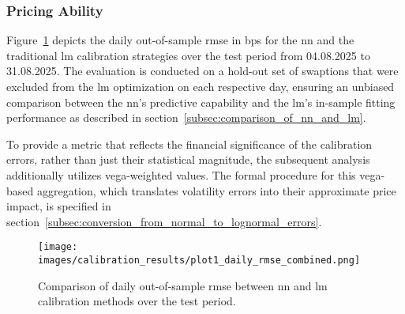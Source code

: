 \subsubsection{Pricing Ability}
Figure~\ref{fig:daily_rmse_comparison} depicts the daily out-of-sample \ac{rmse} in \ac{bps} for the \ac{nn} and the traditional \ac{lm} calibration strategies over the test period from 04.08.2025 to 31.08.2025. The evaluation is conducted on a hold-out set of swaptions that were excluded from the \ac{lm} optimization on each respective day, ensuring an unbiased comparison between the \ac{nn}'s predictive capability and the \ac{lm}'s in-sample fitting performance as described in section~\ref{subsec:comparison_of_nn_and_lm}.

To provide a metric that reflects the financial significance of the calibration errors, rather than just their statistical magnitude, the subsequent analysis additionally utilizes vega-weighted values. The formal procedure for this vega-based aggregation, which translates volatility errors into their approximate price impact, is specified in section~\ref{subsec:conversion_from_normal_to_lognormal_errors}.

\begin{figure}[H]
	\centering
	\texttt{[image: images/calibration\_results/plot1\_daily\_rmse\_combined.png]}
	\caption{Comparison of daily out-of-sample \ac{rmse} between \ac{nn} and \ac{lm} calibration methods over the test period.}
	\label{fig:daily_rmse_comparison}
\end{figure}


